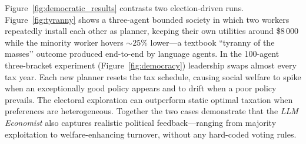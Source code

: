
Figure~\ref{fig:democratic_results} contrasts two election-driven runs.
Figure~\ref{fig:tyranny} shows a three-agent bounded society in which two
workers repeatedly install each other as planner, keeping their own
utilities around \$8\,000 while the minority worker hovers ${\sim}25\%$
lower—a textbook “tyranny of the masses’’ outcome produced end-to-end by
language agents.  In the 100-agent three-bracket experiment
(Figure~\ref{fig:democracy}) leadership swaps almost every tax year.  Each
new planner resets the tax schedule, causing social welfare to spike when
an exceptionally good policy appears and to drift when a poor policy
prevails.  The electoral exploration can outperform static optimal
taxation when preferences are heterogeneous.  Together the two cases
demonstrate that the \emph{LLM Economist} also captures realistic political
feedback—ranging from majority exploitation to welfare-enhancing turnover, without any hard-coded voting rules.



